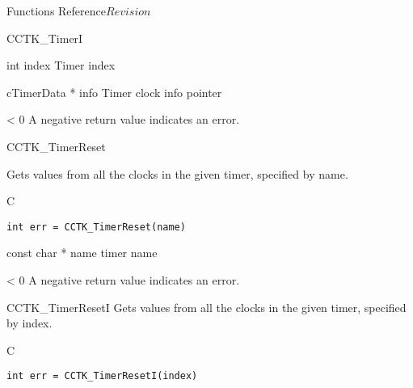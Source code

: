 \begin{cactuspart}{ Functions Reference}{}{$Revision$}
\begin{FunctionDescription}{CCTK\_TimerI}
\begin{ParameterSection}
\begin{Parameter} {int index}
Timer index
\end{Parameter}

\begin{Parameter} {cTimerData * info}
Timer clock info pointer
\end{Parameter}
\end{ParameterSection}

\begin{ErrorSection}
\begin{Error}{< 0}
A negative return value indicates an error.
\end{Error}
\end{ErrorSection}
\end{FunctionDescription}

\begin{FunctionDescription}{CCTK\_TimerReset}

\label{CCTK-TimerReset}
Gets values from all the clocks in the
given timer, specified by name.
\begin{SynopsisSection}
\begin{Synopsis}{C}
\begin{verbatim}
int err = CCTK_TimerReset(name)
\end{verbatim}
\end{Synopsis}
\end{SynopsisSection}

\begin{ParameterSection}
\begin{Parameter} {const char * name}
timer name
\end{Parameter}
\end{ParameterSection}

\begin{ErrorSection}
\begin{Error}{< 0}
A negative return value indicates an error.
\end{Error}
\end{ErrorSection}
\end{FunctionDescription}


\begin{FunctionDescription}{CCTK\_TimerResetI}
\label{CCTK-TimerResetI}
Gets values from all the clocks in the
given timer, specified by index.
\begin{SynopsisSection}
\begin{Synopsis}{C}
\begin{verbatim}
int err = CCTK_TimerResetI(index)
\end{verbatim}
\end{Synopsis}
\end{SynopsisSection}


\end{FunctionDescription}
\end{cactuspart}
